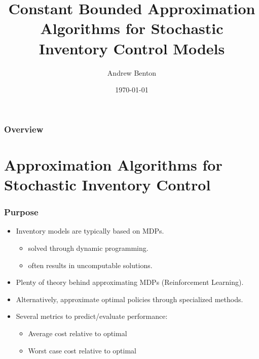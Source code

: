 \documentclass{beamer}
\title[Bounded Approx. Algorithms]{Constant Bounded Approximation Algorithms for Stochastic Inventory Control Models}
\author{Andrew Benton}
\date{\today}
\begin{document}
\begin{frame}
\titlepage 
\end{frame}

\begin{frame}
\frametitle{Overview} 
\tableofcontents 
\end{frame}


\section{Approximation Algorithms for Stochastic Inventory Control} 


\begin{frame}
\frametitle{Purpose}
\begin{itemize}
	\setlength\itemsep{.75em}
	\item Inventory models are typically based on MDPs. 
		\begin{itemize}
			\item solved through dynamic programming. 
			\item often results in uncomputable solutions.
		\end{itemize} 
	\item Plenty of theory behind approximating MDPs (Reinforcement Learning).
	\item Alternatively, approximate optimal policies through specialized methods.
	\item Several metrics to predict/evaluate performance:
		\begin{itemize}
			\item Average cost relative to optimal
			\item Worst case cost relative to optimal
		\end{itemize}
\end{itemize}
\end{frame}

\end{document}

